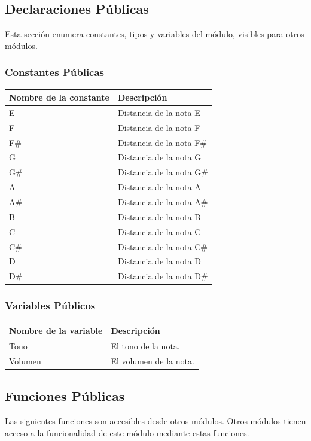 \documentclass[a4paper,12pt]{article}
\begin{document}
\subsection{Declaraciones Públicas}
Esta sección enumera constantes, tipos y variables del módulo, visibles para
otros módulos.
\subsubsection{Constantes Públicas}
\begin{tabular}{| p{30mm} | p{10cm} |}
        \hline
        \textbf{Nombre de la \mbox{constante}} & \textbf{Descripción} \\
        \hline
        E & Distancia de la nota E\\
        F & Distancia de la nota F\\
        F\# & Distancia de la nota F\#\\
        G & Distancia de la nota G\\
        G\# & Distancia de la nota G\#\\
        A & Distancia de la nota A\\
        A\# & Distancia de la nota A\#\\
        B & Distancia de la nota B\\
        C & Distancia de la nota C\\
        C\# & Distancia de la nota C\#\\
        D & Distancia de la nota D\\
        D\# & Distancia de la nota D\#\\
        \hline
\end{tabular}

                

\subsubsection{Variables Públicos}
\begin{tabular}{| p{30mm} | p{10cm} |}
        \hline
        \textbf{Nombre de la \mbox{variable}} & \textbf{Descripción} \\
        \hline
        Tono & El tono de la nota.\\
        Volumen & El volumen de la nota.\\
        \hline
\end{tabular}
\subsection{Funciones Públicas}
Las siguientes funciones son accesibles desde otros módulos. Otros módulos
tienen acceso a la funcionalidad de este módulo mediante estas funciones.
~\\
\end{document}
